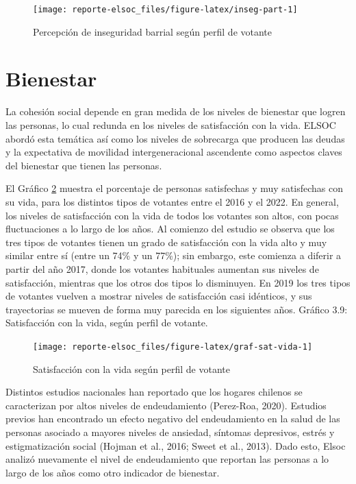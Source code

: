 \documentclass[
  12pt,
]{book}
\begin{document}
\begin{figure}

{\centering \texttt{[image: reporte-elsoc\_files/figure-latex/inseg-part-1]} 

}

\caption{Percepción de inseguridad barrial según perfil de votante}\label{fig:inseg-part}
\end{figure}

\hypertarget{bienestar}{%
\section{Bienestar}\label{bienestar}}

La cohesión social depende en gran medida de los niveles de bienestar que logren las personas, lo cual redunda en los niveles de satisfacción con la vida. ELSOC abordó esta temática así como los niveles de sobrecarga que producen las deudas y la expectativa de movilidad intergeneracional ascendente como aspectos claves del bienestar que tienen las personas.

El Gráfico \ref{fig:graf-sat-vida} muestra el porcentaje de personas satisfechas y muy satisfechas con su vida, para los distintos tipos de votantes entre el 2016 y el 2022. En general, los niveles de satisfacción con la vida de todos los votantes son altos, con pocas fluctuaciones a lo largo de los años. Al comienzo del estudio se observa que los tres tipos de votantes tienen un grado de satisfacción con la vida alto y muy similar entre sí (entre un 74\% y un 77\%); sin embargo, este comienza a diferir a partir del año 2017, donde los votantes habituales aumentan sus niveles de satisfacción, mientras que los otros dos tipos lo disminuyen. En 2019 los tres tipos de votantes vuelven a mostrar niveles de satisfacción casi idénticos, y sus trayectorias se mueven de forma muy parecida en los siguientes años. Gráfico 3.9: Satisfacción con la vida, según perfil de votante.

\begin{figure}

{\centering \texttt{[image: reporte-elsoc\_files/figure-latex/graf-sat-vida-1]} 

}

\caption{Satisfacción con la vida según perfil de votante}\label{fig:graf-sat-vida}
\end{figure}

Distintos estudios nacionales han reportado que los hogares chilenos se caracterizan por altos niveles de endeudamiento (Perez-Roa, 2020). Estudios previos han encontrado un efecto negativo del endeudamiento en la salud de las personas asociado a mayores niveles de ansiedad, síntomas depresivos, estrés y estigmatización social (Hojman et al., 2016; Sweet et al., 2013). Dado esto, Elsoc analizó nuevamente el nivel de endeudamiento que reportan las personas a lo largo de los años como otro indicador de bienestar.
\end{document}
